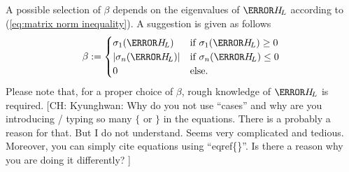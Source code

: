 \documentclass[journal]{IEEEtranTIE}
\newcommand{\CHHA}[1]{{\color{red} [CH: #1]}} %
\newcommand{\KYCH}[1]{{\color{blue} [KC: #1]}} %
\begin{document}

A possible selection of $\beta$ depends on the eigenvalues of $\mm{H}_{\! L}$ according to (\ref{eq:matrix norm inequality}). A suggestion is given as follows
\begin{equation}\label{eq:beta_selec}
\beta  := \begin{cases} 
\sigma _1(\mm{H}_{\! L}) & \text{if } \sigma _1(\mm{H}_{\! L}) \ge 0\,\\
\left| \sigma _n(\mm{H}_{\! L}) \right| &  \text{if }  \sigma _n(\mm{H}_{\! L}) \le 0\\
0 & \text{else}.
\end{cases}
\end{equation}
Please note that, for a proper choice of $\beta$, rough knowledge of $\mm{H}_{\! L}$ is required.
\CHHA{Kyunghwan: Why do you not use ``cases'' and why are you introducing / typing so many $\{$ or $\}$ in the equations. There is a probably a reason for that. But I do not understand. Seems very complicated and tedious. Moreover, you can simply cite equations using ``eqref\{\}''. Is there a reason why you are doing it differently? }
\end{document}
